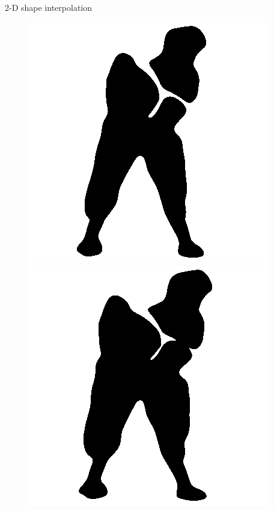 \begin{frame}{2-D shape interpolation}
\begin{figure}
\begin{minipage}[t]{0.08\linewidth}
        \end{minipage}
        \hfill
        \begin{minipage}[t]{0.08\linewidth}
            \vspace{0pt}
            \centering
            \includegraphics[width=\textwidth]{png/kun-chicken/shape-1-3.png}
        \end{minipage}
        \hfill
        \begin{minipage}[t]{0.08\linewidth}
            \vspace{0pt}
            \centering
            \includegraphics[width=\textwidth]{png/kun-chicken/shape-1-4.png}

\end{minipage}
\end{figure}
\end{frame}
